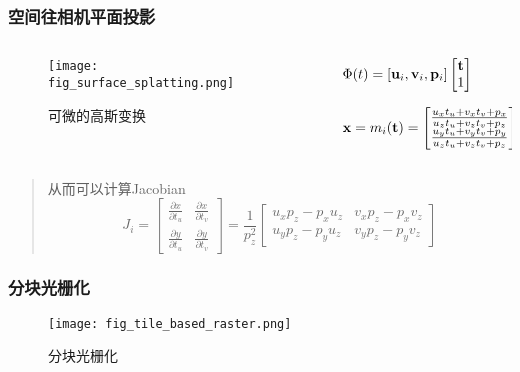 \begin{frame}
    \frametitle{空间往相机平面投影}
    \begin{columns}[c]
        \begin{column}{0.58\textwidth} %
            \begin{figure}[H]
                \centering
                \texttt{[image: fig\_surface\_splatting.png]}
                \caption{可微的高斯变换}
                \label{fig:diff_gaussian_splatting}
            \end{figure}
        \end{column}
        \begin{column}{0.4\textwidth} %
            $\Phi(t)=[\bold{u}_i,\bold{v}_i,\bold{p}_i]\left[\begin{matrix} \bold{t} \\ 1 \end{matrix}\right]$

            $\bold{x}=m_i(\bold{t})=\left[\begin{matrix} \frac{u_xt_u+v_xt_v+p_x}{u_zt_u+v_zt_v+p_z} \\  \frac{u_yt_u+v_yt_v+p_y}{u_zt_u+v_zt_v+p_z} \end{matrix}\right]$
        \end{column}
    \end{columns}
    \begin{quote}
        从而可以计算Jacobian 
        $$J_i=\left[\begin{matrix}\frac{\partial x}{\partial t_u} & \frac{\partial x}{\partial t_v} \\ \frac{\partial y}{\partial t_u} & \frac{\partial y}{\partial t_v} \end{matrix}\right]=\frac{1}{p_z^2}\left[\begin{matrix}u_xp_z-p_xu_z & v_xp_z - p_xv_z\\ u_yp_z-p_yu_z & v_yp_z-p_yv_z \end{matrix}\right]$$
    \end{quote}
\end{frame}

\begin{frame}
    \frametitle{分块光栅化}
    \begin{figure}[H]
        \centering
        \texttt{[image: fig\_tile\_based\_raster.png]}
        \caption{分块光栅化}
        \label{fig:tile_render}
    \end{figure}
\end{frame}

